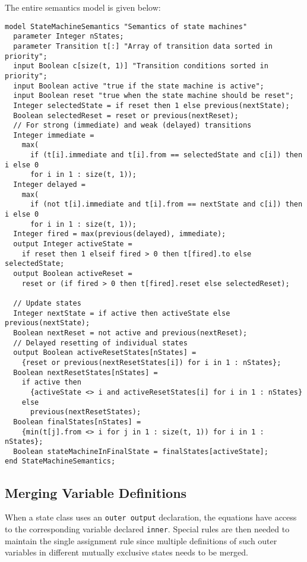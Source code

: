 The entire semantics model is given below:
\begin{lstlisting}[language=modelica]
model StateMachineSemantics "Semantics of state machines"
  parameter Integer nStates;
  parameter Transition t[:] "Array of transition data sorted in priority";
  input Boolean c[size(t, 1)] "Transition conditions sorted in priority";
  input Boolean active "true if the state machine is active";
  input Boolean reset "true when the state machine should be reset";
  Integer selectedState = if reset then 1 else previous(nextState);
  Boolean selectedReset = reset or previous(nextReset);
  // For strong (immediate) and weak (delayed) transitions
  Integer immediate =
    max(
      if (t[i].immediate and t[i].from == selectedState and c[i]) then i else 0
      for i in 1 : size(t, 1));
  Integer delayed =
    max(
      if (not t[i].immediate and t[i].from == nextState and c[i]) then i else 0
      for i in 1 : size(t, 1));
  Integer fired = max(previous(delayed), immediate);
  output Integer activeState =
    if reset then 1 elseif fired > 0 then t[fired].to else selectedState;
  output Boolean activeReset =
    reset or (if fired > 0 then t[fired].reset else selectedReset);

  // Update states
  Integer nextState = if active then activeState else previous(nextState);
  Boolean nextReset = not active and previous(nextReset);
  // Delayed resetting of individual states
  output Boolean activeResetStates[nStates] =
    {reset or previous(nextResetStates[i]) for i in 1 : nStates};
  Boolean nextResetStates[nStates] =
    if active then
      {activeState <> i and activeResetStates[i] for i in 1 : nStates}
    else
      previous(nextResetStates);
  Boolean finalStates[nStates] =
    {min(t[j].from <> i for j in 1 : size(t, 1)) for i in 1 : nStates};
  Boolean stateMachineInFinalState = finalStates[activeState];
end StateMachineSemantics;
\end{lstlisting}

\subsection{Merging Variable Definitions}\label{merging-variable-definitions}

\begin{nonnormative}
When a state class uses an \lstinline!outer output! declaration, the equations have access to the corresponding variable declared \lstinline!inner!.
Special rules are then needed to maintain the single assignment rule since multiple definitions of such outer variables in different mutually exclusive states needs to be merged.
\end{nonnormative}


